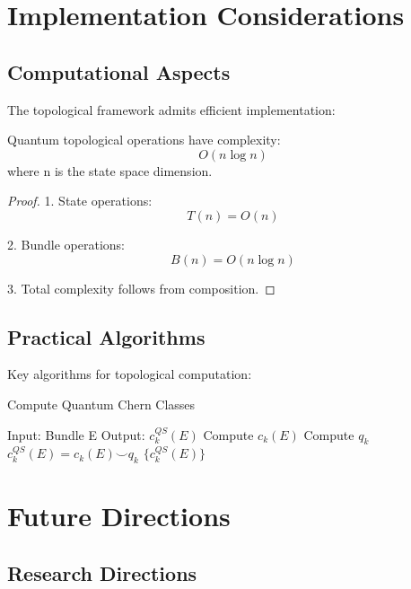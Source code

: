 \documentclass[12pt]{article}
\begin{document}
\section{Implementation Considerations}

\subsection{Computational Aspects}

The topological framework admits efficient implementation:

\begin{theorem}
Quantum topological operations have complexity:
\begin{equation}
O(n \log n)
\end{equation}
where n is the state space dimension.
\end{theorem}

\begin{proof}
1. State operations:
\begin{equation}
T(n) = O(n)
\end{equation}

2. Bundle operations:
\begin{equation}
B(n) = O(n \log n)
\end{equation}

3. Total complexity follows from composition.
\end{proof}

\subsection{Practical Algorithms}

Key algorithms for topological computation:

\begin{algorithm}[H]
\caption{Compute Quantum Chern Classes}
\begin{algorithmic}
\STATE Input: Bundle E
\STATE Output: $c_k^{QS}(E)$
\STATE Compute $c_k(E)$
\STATE Compute $q_k$
\STATE $c_k^{QS}(E) = c_k(E) \smile q_k$
\ENDFOR
\RETURN $\{c_k^{QS}(E)\}$
\end{algorithmic}
\end{algorithm}

\section{Future Directions}

\subsection{Research Directions}
\end{document}
